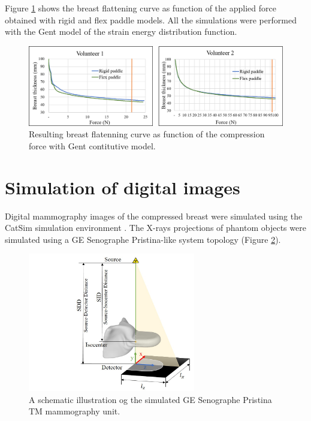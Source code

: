 Figure \ref{fig:forceThicknessResults} shows the breast flattening curve as function of the applied force obtained with rigid and flex paddle models. All the simulations were performed with the Gent model of the strain energy distribution function. 

\begin{figure}[!h]
\centering
\includegraphics[width=1\textwidth,keepaspectratio]{figures/forceThicknessResults.png} 
\caption{Resulting breast flatenning curve as function of the compression force with Gent contitutive model. }\label{fig:forceThicknessResults}
\end{figure}
    
\section{Simulation of digital images }
Digital mammography images of the compressed breast were simulated using the CatSim simulation environment \citep{de_low_2014}. The  X-rays projections of phantom objects were simulated using a GE Senographe Pristina-like system topology (Figure \ref{fig:systemgeometry}). 


\begin{figure}[!h]
\centering
\includegraphics[width=0.65\textwidth,keepaspectratio]{figures/systemgeometry.jpg} 
\caption{A schematic illustration og the simulated GE Senographe Pristina TM mammography unit.}
\label{fig:systemgeometry}
\end{figure}

